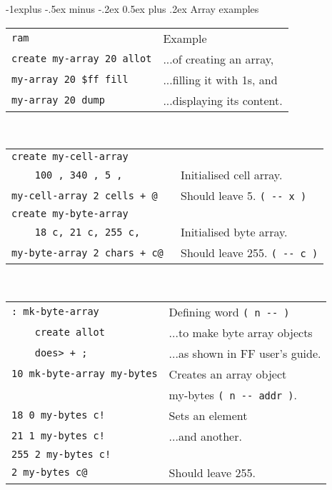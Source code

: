 \documentclass[10pt,landscape,a4paper]{article}
\makeatletter
\renewcommand{\subsection}{\@startsection{subsection}{2}{0mm}%
                                {-1explus -.5ex minus -.2ex}%
                                {0.5ex plus .2ex}%
                                {\normalfont\normalsize\bfseries}}
\makeatother
\begin{document}
\begin{multicols}{3}
\subsection{Array examples}
\begin{tabular}{@{}ll@{}}
\verb!ram!                       & Example  \\
\verb!create my-array 20 allot!  & ...of creating an array, \\
\verb!my-array 20 $ff fill!      & ...filling it with 1s, and \\
\verb!my-array 20 dump!          & ...displaying its content. \\
\end{tabular}\\
\begin{tabular}{@{}ll@{}}
\verb!create my-cell-array!      & \\
\verb!    100 , 340 , 5 , !      & Initialised cell array. \\
\verb!my-cell-array 2 cells + @ !  & Should leave 5. \verb!( -- x )! \\
\verb!create my-byte-array!      & \\
\verb!    18 c, 21 c, 255 c,!    & Initialised byte array. \\
\verb!my-byte-array 2 chars + c@ !  & Should leave 255. \verb!( -- c )! \\
\end{tabular}\\
\begin{tabular}{@{}ll@{}}
\verb!: mk-byte-array !   & Defining word \verb!( n -- )! \\
\verb!    create allot!   & ...to make byte array objects \\
\verb!    does> + ; !     & ...as shown in FF user's guide. \\
\verb!10 mk-byte-array my-bytes!  & Creates an array object \\
                                  & my-bytes \verb!( n -- addr )!. \\
\verb?18 0 my-bytes c!?           & Sets an element \\
\verb?21 1 my-bytes c!?           & ...and another.\\
\verb?255 2 my-bytes c!?          & \\
\verb!2 my-bytes c@!              & Should leave 255. \\
\end{tabular}\\
\begin{tabular}{@{}ll@{}}

\end{tabular}
\end{multicols}
\end{document}
